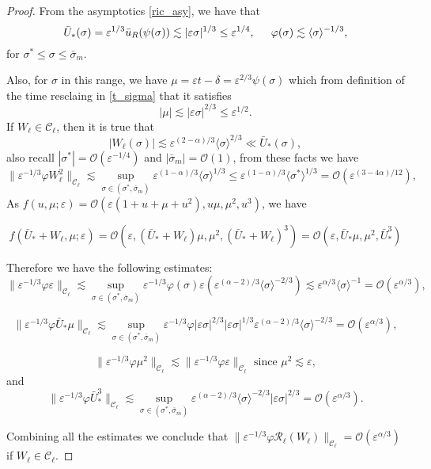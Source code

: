 \documentclass[letterpaper,11pt]{article}
\newcommand{\rmO}{\mathcal{O}}
\newcommand{\eps}{\varepsilon}
\newcommand{\lar}{ \lesssim }
\numberwithin{equation}{section}
\theoremstyle{plain}
\begin{document}
\begin{proof}
From the asymptotics \eqref{ric_asy}, we have that
\[
\bar{U}_*(\sigma) = \eps^{1/3} \bar{u}_R(\psi(\sigma)) \lar |\eps \sigma|^{1/3}\le \eps^{1/4}, \hspace{0.2in} \varphi(\sigma) \lar \langle\sigma\rangle^{-1/3} ,
\]
for $\sigma^*\le \sigma \le \bar{\sigma}_m$.

Also, for $\sigma$ in this range, we have $\mu = \eps t -\delta = \eps^{2/3}\psi(\sigma)$ which from definition of the time resclaing in \ref{t_sigma}  that it satisfies
\[
|\mu| \lar |\eps \sigma|^{2/3} \le \eps^{1/2}.
\]
If $W_\ell \in \mathcal{C}_\ell$, then it is true that
\[
|W_\ell(\sigma)| \lar \eps^{(2-\alpha)/3} \langle \sigma \rangle^{2/3} \ll \bar{U}_*(\sigma), 
\]
also recall $|\sigma^*| = \rmO(\eps^{-1/4})$ and $|\bar{\sigma}_m| = \rmO(1)$, from these facts we have
\[
\|\eps^{-1/3}\varphi W_\ell^2\|_{\mathcal{C}_\ell} \lar \sup_{\sigma \in (\sigma^{*},\bar{\sigma}_m)} \eps^{(1-\alpha)/3}\langle \sigma\rangle^{1/3}  \le \eps^{(1-\alpha)/3} \langle \sigma^{*} \rangle^{1/3} = \rmO(\eps^{(3-4\alpha)/12}),
\]
As $f(u,\mu; \eps) = \rmO(\eps(1+u+\mu+u^2),u\mu,\mu^2,u^3)$, we have

\[
f(\bar{U}_*+W_\ell, \mu ;\eps) = \rmO(\eps, (\bar{U}_*+W_\ell)\mu, \mu^2, (\bar{U}_*+W_\ell)^3 ) = \rmO(\eps, \bar{U}_*\mu, \mu^2, \bar{U}_*^3)
\]

Therefore we have the following estimates:
\[
\|\eps^{-1/3}\varphi \eps \|_{\mathcal{C}_\ell} \lar \sup_{\sigma \in (\sigma^{*},\bar{\sigma}_m)} \eps^{-1/3} \varphi(\sigma) \eps (\eps^{(\alpha-2)/3}\langle \sigma\rangle^{-2/3}) \lar \eps^{\alpha/3} \langle\sigma\rangle^{-1} =\rmO(\eps^{\alpha/3}),
\]

\[
\|\eps^{-1/3}\varphi \bar{U}_*\mu \|_{\mathcal{C}_\ell} \lar \sup_{\sigma \in (\sigma^{*},\bar{\sigma}_m)} \eps^{-1/3}\varphi |\eps\sigma|^{2/3}|\eps\sigma|^{1/3}\eps^{(\alpha-2)/3}\langle \sigma\rangle^{-2/3}  = \rmO(\eps^{\alpha/3}),
\]

\[
\|\eps^{-1/3}\varphi \mu^2 \|_{\mathcal{C}_\ell} \lar \|\eps^{-1/3}\varphi \eps \|_{\mathcal{C}_\ell} \text{ since } \mu^2 \lar \eps,
\]
and 
\[
\|\eps^{-1/3}\varphi \bar{U}_*^3 \|_{\mathcal{C}_\ell}  \lar \sup_{\sigma \in (\sigma^{*},\bar{\sigma}_m)}\eps^{(\alpha-2)/3}\langle \sigma\rangle^{-2/3} |\eps \sigma|^{2/3} = \rmO(\eps^{\alpha/3}).
\]

Combining all the estimates we conclude that $\|\eps^{-1/3}\varphi \mathcal{R}_\ell(W_\ell)\|_{\mathcal{C}_\ell} = \rmO(\eps^{\alpha/3})$ if $W_\ell \in \mathcal{C}_\ell$.
\end{proof}
\end{document}

